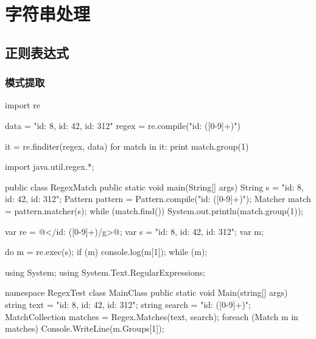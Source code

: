 \documentclass[hidelinks]{ctexart}
\begin{document}

\section{字符串处理} %
\label{sec:字符串处理}

\subsection{正则表达式} %
\label{sub:正则表达式}

\subsubsection{模式提取} %
\label{ssub:模式提取}

\begin{pylst}
import re

data = "id: 8, id: 42, id: 312"
regex = re.compile("id: ([0-9]+)")

it = re.finditer(regex, data)
for match in it:
    print match.group(1)
\end{pylst}
\begin{javalst}
import java.util.regex.*;

public class RegexMatch {
    public static void main(String[] args) {
        String s = "id: 8, id: 42, id: 312";
        Pattern pattern = Pattern.compile("id: ([0-9]+)");
        Matcher match = pattern.matcher(s);
        while (match.find()) {
            System.out.println(match.group(1));
        }
    }
}
\end{javalst}
\begin{jslst}
var re = @</id: ([0-9]+)/g>@;
var s = "id: 8, id: 42, id: 312";
var m;

do {
    m = re.exec(s);
    if (m) {
        console.log(m[1]);
    }
} while (m);
\end{jslst}
\begin{cshlst}
using System;
using System.Text.RegularExpressions;

namespace RegexTest
{
    class MainClass
    {
        public static void Main(string[] args)
        {
            string text = "id: 8, id: 42, id: 312";
            string search = "id: ([0-9]+)";
            MatchCollection matches = Regex.Matches(text, search);
            foreach (Match m in matches)
            {
                Console.WriteLine(m.Groups[1]);
            }
        }
    }
}
\end{cshlst}



\end{document}
